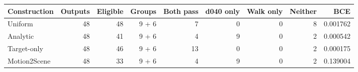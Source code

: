 \begin{tabular}{lrrrrrrrr}
\toprule
Construction & Outputs & Eligible & Groups & Both pass & d040 only & Walk only & Neither & BCE \\
\midrule
Uniform & 48 & 48 & 9 + 6 & 7 & 0 & 0 & 8 & 0.001762 \\
Analytic & 48 & 41 & 9 + 6 & 4 & 9 & 0 & 2 & 0.000542 \\
Target-only & 48 & 46 & 9 + 6 & 13 & 0 & 0 & 2 & 0.000175 \\
Motion2Scene & 48 & 33 & 9 + 6 & 4 & 9 & 0 & 2 & 0.139004 \\
\bottomrule
\end{tabular}
